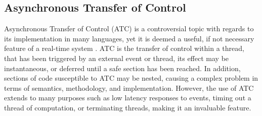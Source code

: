 \subsection{Asynchronous Transfer of Control}
Asynchronous Transfer of Control (ATC) is a controversial topic with regards to its 
implementation in many languages, yet it is deemed a useful, if not necessary 
feature of a real-time system 
\cite{books.google.co.uk/books?id=pD9sCQAAQBAJ&pg=PA113}. ATC is the transfer 
of control within a thread, that has been triggered by an external event or thread, 
its effect may be instantaneous, or deferred until a safe section has been reached. 
In addition, sections of code susceptible to ATC may be nested, causing a 
complex problem in terms of semantics, methodology, and implementation. 
However, the use of ATC extends to many purposes such as low latency responses to events, timing 
out a thread of computation, or terminating threads, making it an invaluable feature. 

